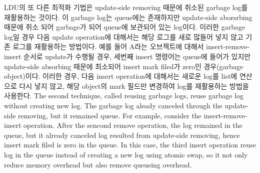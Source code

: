 
\ifkor
LDU의 또 다른 최적화 기법은 update-side removing 때문에 취소된 garbage log를 재활용하는 것이다.
이 garbage log는 queue에는 존재하지만 update-side aborsrbing 때문에 취소 되어 garbage가 되어 queue에
보관되어 있는 log이다. 
이러한 garbage log일 경우 다음 update operation에 대해서는 해당 로그를 새로 많들어 넣지 않고 기존 로그를 재활용하는
방법이다.
예를 들어 A라는 오브젝트에 대해서 insert-remove-insert 순서로 update가 수행될 경우, 세번째 insert 명령어는
queue에 들어가 있지만 update-side absorbing 때문에 최소되어 insert mark filed가 zero인
경우(garbage object)이다.
이러한 경우, 다음 insert operation에 대해서는 새로운 log를 list에 연산으로 다시 넣지 않고, 해당 object의 mark
필드만 변경하여 log를 재활용하는 방법을 사용한다.
\else
The second technique, called reusing garbage logs, reuse garbage log without
creating new log.
The garbage log aleady canceled through the update-side removing, but it
remained queue.
For example, consider the insert-remove-insert operation.
After the sencond remove operation, the log remained in the queue, but it
already canceled log resulted from update-side removing, hence insert mark filed is
zero in the queue.
In this case, the third insert operation reuse log in the queue instead of 
creating a new log using atomic swap, so it not only reduce memory overhead but
also remove queueing overhead.
\fi

